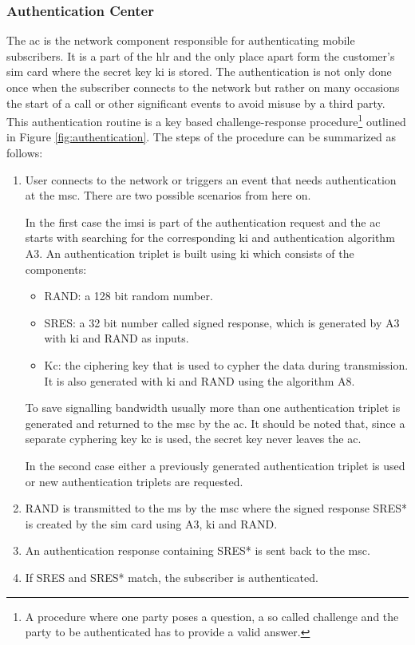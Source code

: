 \subsubsection{Authentication Center}
\label{sec:authentication}
The \gls{ac} is the network component responsible for authenticating mobile subscribers.
It is a part of the \gls{hlr} and the only place apart form the customer's \gls{sim} card where the secret key \gls{ki} is stored.
The authentication is not only done once when the subscriber connects to the network but rather on many occasions \eg the start of a call or other significant events to avoid misuse by a third party.
This authentication routine is a key based challenge-response procedure\footnote{A procedure where one party poses a question, a so called challenge and the party to be authenticated has to provide a valid answer.} outlined in Figure \ref{fig:authentication}.
The steps of the procedure can be summarized as follows:
\begin{enumerate}
	\item User connects to the network or triggers an event that needs authentication at the \gls{msc}.
	There are two possible scenarios from here on.
 	
 	In the first case the \gls{imsi} is part of the authentication request and the \gls{ac} starts with searching for the corresponding \gls{ki} and authentication algorithm A3.
	An authentication triplet is built using \gls{ki} which consists of the components:
	\begin{itemize}
		\item RAND: a 128 bit random number.
		\item SRES: a 32 bit number called signed response, which is generated by A3 with \gls{ki} and RAND as inputs.
		\item Kc: the ciphering key that is used to cypher the data during transmission.
		It is also generated with \gls{ki} and RAND using the algorithm A8.
	\end{itemize}
	To save signalling bandwidth usually more than one authentication triplet is generated and returned to the \gls{msc} by the \gls{ac}.
	It should be noted that, since a separate cyphering key \gls{kc} is used, the secret key never leaves the \gls{ac}.
	
	In the second case either a previously generated authentication triplet is used or new authentication triplets are requested.
	\item RAND is transmitted to the \gls{ms} by the \gls{msc} where the signed response SRES* is created by the \gls{sim} card using A3, \gls{ki} and RAND.
	
	\item An authentication response containing SRES* is sent back to the \gls{msc}.
	
	\item If SRES and SRES* match, the subscriber is authenticated.
\end{enumerate}

